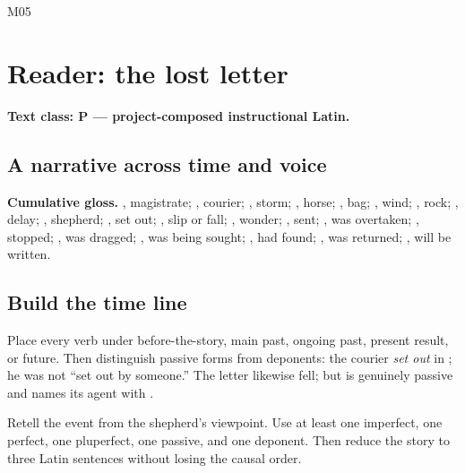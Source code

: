 \begin{courseunit}{M05}
\chapter{Reader: the lost letter}

\textbf{Text class: P --- project-composed instructional Latin.}

\section{A narrative across time and voice}


\textbf{Cumulative gloss.} , magistrate; ,
courier; , storm; , horse; , bag;
, wind; , rock; , delay;
, shepherd; , set
out; , slip or fall; , wonder; , sent; , was overtaken;
, stopped; , was dragged;
, was being sought; , had found;
, was returned; , will be written.

\section{Build the time line}

Place every verb under before-the-story, main past, ongoing past, present
result, or future.  Then distinguish passive forms from deponents: the courier
\emph{set out} in ; he was not ``set out by someone.''  The
letter  likewise fell; but  is genuinely
passive and names its agent with .

Retell the event from the shepherd's viewpoint.  Use at least one imperfect,
one perfect, one pluperfect, one passive, and one deponent.  Then reduce the
story to three Latin sentences without losing the causal order.


\end{courseunit}

